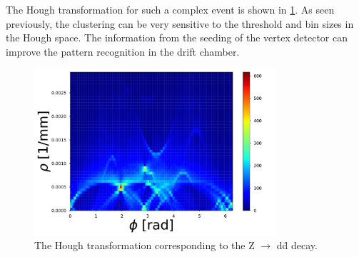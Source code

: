 The Hough transformation for such a complex event is shown in \cref{HTZdd}. As seen previously, the clustering can be very sensitive to the threshold and bin sizes in the Hough space. The information from the seeding of the vertex detector can improve the pattern recognition in the drift chamber.

\begin{figure}[ht]
	\centering
  \includegraphics[width=0.8\textwidth]{figures/HT_Zdd.pdf}
	\caption{The Hough transformation corresponding to the Z $\rightarrow$ d\={d} decay.}
	\label{HTZdd}
\end{figure}
